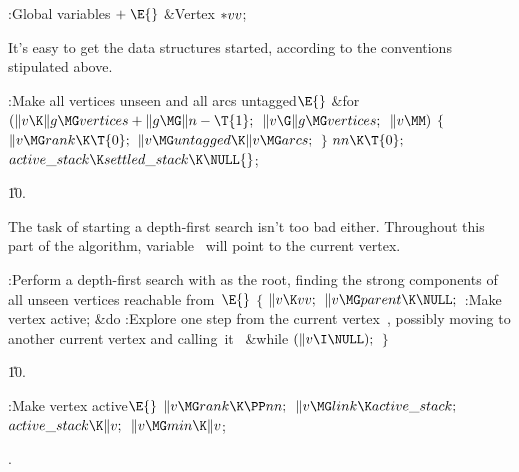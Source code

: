 \B{}:Global variables\X${}\mathrel+\E{}$\6
\&{Vertex} ${}{*}\\{vv}{}$;\par
\fi

It's easy to get the data structures started, according to the
conventions stipulated above.

\Y\B\4:Make all vertices unseen and all arcs untagged\X${}\E{}$\6
\&{for} ${}(\|v\K\|g\MG\\{vertices}+\|g\MG\|n-\T{1};{}$ ${}\|v\G\|g\MG%
\\{vertices};{}$ ${}\|v\MM){}$\5
${}\{{}$\1\6
${}\|v\MG\\{rank}\K\T{0};{}$\6
${}\|v\MG\\{untagged}\K\|v\MG\\{arcs};{}$\6
\4${}\}{}$\2\6
${}\\{nn}\K\T{0};{}$\6
${}\\{active\_stack}\K\\{settled\_stack}\K\NULL{}$;\par
\U10.\fi

The task of starting a depth-first search isn't too bad either.
Throughout
this part of the algorithm, variable~ will point to the current vertex.

\Y\B\4:Perform a depth-first search with  as the root, finding
the strong components of all unseen vertices reachable from~\X${}%
\E{}$\6
${}\{{}$\1\6
${}\|v\K\\{vv};{}$\6
${}\|v\MG\\{parent}\K\NULL;{}$\6
:Make vertex  active\X;\6
\&{do}\5
:Explore one step from the current vertex~, possibly moving to
another current vertex and calling~it~\X\5
\&{while} ${}(\|v\I\NULL);{}$\6
\4${}\}{}$\2\par
\U10.\fi

\B{}:Make vertex  active\X${}\E{}$\6
$\|v\MG\\{rank}\K\PP\\{nn};{}$\6
${}\|v\MG\\{link}\K\\{active\_stack};{}$\6
${}\\{active\_stack}\K\|v;{}$\6
${}\|v\MG\\{min}\K\|v{}$;\par
{}.\fi

